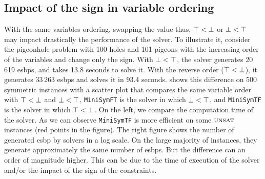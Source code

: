 \subsection{Impact of the sign in variable ordering}
With the same variables ordering, swapping the value thus, $\top < \bot$ or $\bot < \top$
may impact drastically the performance of the solver.
To illustrate it, consider the pigeonhole problem with 100 holes and 101 pigeons with 
the increasing order of the variables and change only the sign.
With  $\bot < \top$, the solver generates 20\,619 esbps, and takes 13.8 seconds to solve it.
With the reverse order ($\top < \bot$), it generates 33\,263 esbps and solves it in 93.4 seconds.
 shows this difference on 500 symmetric instances with
a scatter plot that compares the same variable order with $\top < \bot$ and $\bot < \top$,
 \texttt{MiniSymFT} is the solver in which $\bot < \top$, and  \texttt{MiniSymTF} is the solver in which $\top < \bot$.
On the left, we compare the computation time of the solver. 
As we can observe \texttt{MiniSymTF} is more efficient on some $\textsc{unsat}$ instances (red points in the figure).
The right figure shows the number of generated esbp by solvers in a log scale. On the large majority of instances, they generate 
approximately the same number of esbps. But the difference can an order of magnitude higher. This can be due to the time of
execution of the solver and/or the impact of the sign of the constraints.

